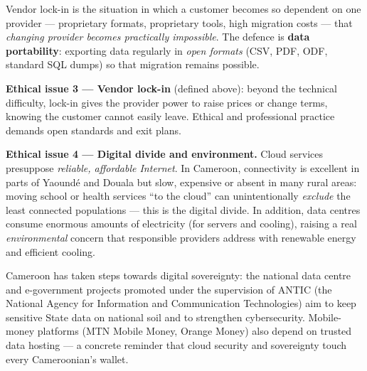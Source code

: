\documentclass[11pt]{article}
\newcommand{\cle}[1]{{\popxbold\color{popdark}#1}}
\begin{document}
\begin{definition}
\cle{Vendor lock-in} is the situation in which a customer becomes so dependent on one provider — proprietary formats, proprietary tools, high migration costs — that \emph{changing provider becomes practically impossible}. The defence is \textbf{data portability}: exporting data regularly in \emph{open formats} (CSV, PDF, ODF, standard SQL dumps) so that migration remains possible.
\end{definition}

\textbf{Ethical issue 3 — Vendor lock-in} (defined above): beyond the technical difficulty, lock-in gives the provider power to raise prices or change terms, knowing the customer cannot easily leave. Ethical and professional practice demands open standards and exit plans.

\textbf{Ethical issue 4 — Digital divide and environment.} Cloud services presuppose \emph{reliable, affordable Internet}. In Cameroon, connectivity is excellent in parts of Yaound\'e and Douala but slow, expensive or absent in many rural areas: moving school or health services ``to the cloud'' can unintentionally \emph{exclude} the least connected populations — this is the \cle{digital divide}. In addition, data centres consume enormous amounts of electricity (for servers and cooling), raising a real \emph{environmental} concern that responsible providers address with renewable energy and efficient cooling.

\begin{savaistu}
Cameroon has taken steps towards digital sovereignty: the national data centre and e-government projects promoted under the supervision of ANTIC (the National Agency for Information and Communication Technologies) aim to keep sensitive State data on national soil and to strengthen cybersecurity. Mobile-money platforms (MTN Mobile Money, Orange Money) also depend on trusted data hosting — a concrete reminder that cloud security and sovereignty touch every Cameroonian's wallet.
\end{savaistu}
\end{document}
